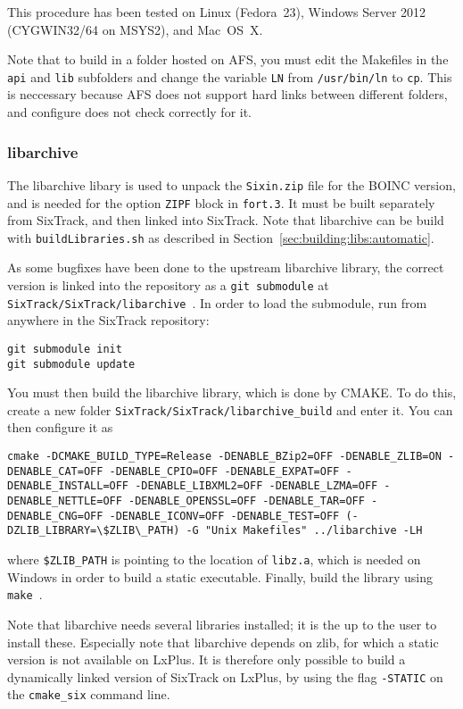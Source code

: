 \documentclass[english,BCOR=0mm,DIV=18]{scrartcl}
\begin{document}
This procedure has been tested on Linux (Fedora~23), Windows Server 2012 (CYGWIN32/64 on MSYS2), and Mac~OS~X.

Note that to build in a folder hosted on AFS, you must edit the Makefiles in the \texttt{api} and \texttt{lib} subfolders and change the variable \texttt{LN} from \texttt{/usr/bin/ln} to \texttt{cp}.
This is neccessary because AFS does not support hard links between different folders, and configure does not check correctly for it.

\subsubsection{libarchive}
\label{sec:building:libs:libarchive}
The libarchive libary is used to unpack the \texttt{Sixin.zip} file for the BOINC version, and is needed for the option \texttt{ZIPF} block in \texttt{fort.3}.
It must be built separately from SixTrack, and then linked into SixTrack.
Note that libarchive can be build with \texttt{buildLibraries.sh} as described in Section~\ref{sec:building:libs:automatic}.

As some bugfixes have been done to the upstream libarchive library, the correct version is linked into the repository as a \texttt{git submodule}  at \texttt{SixTrack/SixTrack/libarchive}~.
In order to load the submodule, run from anywhere in the SixTrack repository:
\begin{lstlisting}
git submodule init
git submodule update
\end{lstlisting}

You must then build the libarchive library, which is done by CMAKE.
To do this, create a new folder \texttt{SixTrack/SixTrack/libarchive\_build} and enter it.
You can then configure it as 
\begin{lstlisting}
cmake -DCMAKE_BUILD_TYPE=Release -DENABLE_BZip2=OFF -DENABLE_ZLIB=ON -DENABLE_CAT=OFF -DENABLE_CPIO=OFF -DENABLE_EXPAT=OFF -DENABLE_INSTALL=OFF -DENABLE_LIBXML2=OFF -DENABLE_LZMA=OFF -DENABLE_NETTLE=OFF -DENABLE_OPENSSL=OFF -DENABLE_TAR=OFF -DENABLE_CNG=OFF -DENABLE_ICONV=OFF -DENABLE_TEST=OFF (-DZLIB_LIBRARY=\$ZLIB\_PATH) -G "Unix Makefiles" ../libarchive -LH
\end{lstlisting}
where \texttt{\$ZLIB\_PATH} is pointing to the location of \texttt{libz.a}, which is needed on Windows in order to build a static executable.
Finally, build the library using \texttt{make}~.

Note that libarchive needs several libraries installed; it is the up to the user to install these.
Especially note that libarchive depends on zlib, for which a static version is not available on LxPlus.
It is therefore only possible to build a dynamically linked version of SixTrack on LxPlus, by using the flag \texttt{-STATIC} on the \texttt{cmake\_six} command line.
\end{document}
